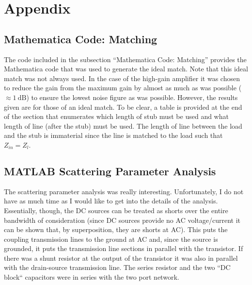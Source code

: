 \section{Appendix}

\subsection{Mathematica Code: Matching}
The code included in the subsection ``Mathematica Code: Matching'' provides the
Mathematica code that was used to generate the ideal match. Note that this ideal
match was not always used. In the case of the high-gain amplifier it was chosen
to reduce the gain from the maximum gain by almost as much as was possible
($\approx \SI{1}{\deci\bel}$) to ensure the lowest noise figure as was possible.
However, the results given are for those of an ideal match. To be clear, a table
is provided at the end of the section that enumerates which length of stub must
be used and what length of line (after the stub) must be used. The length of
line between the load and the stub is immaterial since the line is matched to
the load such that $Z_{in} = Z_l$.








\subsection{MATLAB Scattering Parameter Analysis}

The scattering parameter analysis was really interesting. Unfortunately, I do
not have as much time as I would like to get into the details of the analysis.
Essentially, though, the DC sources can be treated as shorts over the entire
bandwidth of consideration (since DC sources provide no AC voltage/current it
can be shown that, by superposition, they are shorts at AC). This puts the
coupling transmission lines to the ground at AC and, since the source is
grounded, it puts the transmission line sections in parallel with the
transistor. If there was a shunt resistor at the output of the transistor it was
also in parallel with the drain-source transmission line. The series resistor
and the two ``DC block`` capacitors were in series with the two port network.

